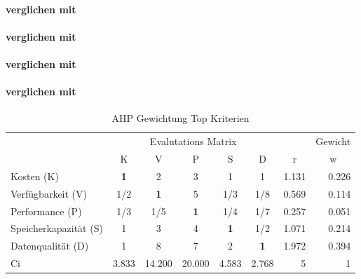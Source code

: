 \paragraph*{ verglichen mit }

\paragraph*{ verglichen mit }

\paragraph*{ verglichen mit }

\paragraph*{ verglichen mit }




\begin{table}[htbp]
\caption{AHP Gewichtung Top Kriterien}
\begin{tabular}{|l|c|c|c|c|c|r|r|}
\hline
\multicolumn{ 1}{|c|}{} & \multicolumn{ 5}{c|}{Evalutations Matrix} & \multicolumn{1}{l|}{} & \multicolumn{1}{l|}{Gewicht} \\ \cline{ 2- 8}
\multicolumn{ 1}{|c|}{} & K & V & P & S & D & \multicolumn{1}{c|}{r} & \multicolumn{1}{c|}{w} \\ \hline
Kosten (K) & \textbf{1} & 2 & 3 & 1 & 1 & 1.131 & 0.226 \\ \hline
Verfügbarkeit (V) &  1/2 & \textbf{1} & 5 &  1/3 &  1/8 & 0.569 & 0.114 \\ \hline
Performance (P) &  1/3 &  1/5 & \textbf{1} &  1/4 &  1/7 & 0.257 & 0.051 \\ \hline
Speicherkapazität (S) & 1 & 3 & 4 & \textbf{1} &  1/2 & 1.071 & 0.214 \\ \hline
Datenqualität (D) & 1 & 8 & 7 & 2 & \textbf{1} & 1.972 & 0.394 \\ \hline  \hline
Ci & \multicolumn{1}{r|}{3.833} & \multicolumn{1}{r|}{14.200} & \multicolumn{1}{r|}{20.000} & \multicolumn{1}{r|}{4.583} & \multicolumn{1}{r|}{2.768} & 5 & 1 \\ \hline 
\end{tabular}
\label{AHPTop}
\end{table}

